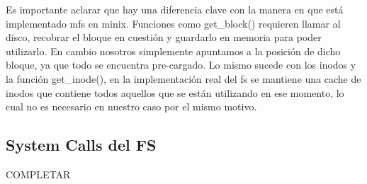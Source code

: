 Es importante aclarar que hay una diferencia clave con la manera en que está
implementado mfs en minix. Funciones como get\_block() requieren llamar al
disco, recobrar el bloque en cuestión y guardarlo en memoria para poder
utilizarlo. En cambio nosotros simplemente apuntamos a la posición de dicho
bloque, ya que todo se encuentra pre-cargado. Lo mismo sucede con los inodos y
la función get\_inode(), en la implementación real del fs se mantiene una cache
de inodos que contiene todos aquellos que se están utilizando en ese momento,
lo cual no es necesario en nuestro caso por el mismo motivo.

\subsection{System Calls del FS}

COMPLETAR
